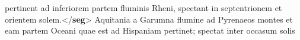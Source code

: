 \begin{shaded}
\hspace*{1em}\hspace*{1em}\hspace*{1em}\hspace*{1em}\hspace*{1em}\hspace*{1em}\hspace*{1em}\hspace*{1em}\hspace*{1em}\hspace*{1em}\hspace*{1em}\hspace*{1em} pertinent ad inferiorem partem fluminis Rheni, spectant in septentrionem et\mbox{}\newline 
\hspace*{1em}\hspace*{1em}\hspace*{1em}\hspace*{1em}\hspace*{1em}\hspace*{1em}\hspace*{1em}\hspace*{1em}\hspace*{1em}\hspace*{1em}\hspace*{1em}\hspace*{1em} orientem solem.{</\textbf{seg}>}\mbox{}\newline 
\hspace*{1em}\hspace*{1em}\hspace*{1em}\hspace*{1em}\hspace*{1em}Aquitania a Garumna flumine ad Pyrenaeos montes et\mbox{}\newline 
\hspace*{1em}\hspace*{1em}\hspace*{1em}\hspace*{1em}\hspace*{1em}\hspace*{1em}\hspace*{1em}\hspace*{1em}\hspace*{1em}\hspace*{1em}\hspace*{1em}\hspace*{1em} eam partem Oceani quae est ad Hispaniam pertinet; spectat inter occasum solis\mbox{}\newline 

\end{shaded}
